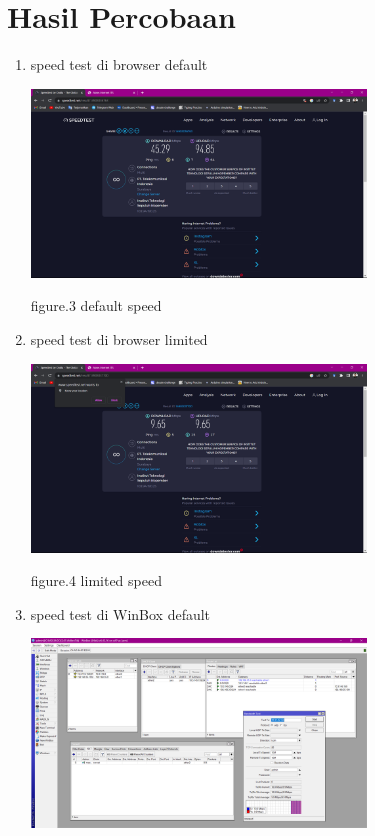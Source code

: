 \section{Hasil Percobaan}
\begin{enumerate}
    \item speed test di browser default
    \begin{center}
        \includegraphics[width=0.7\textwidth]{image/P3/browser/default.png}

        figure.3 default speed
    \end{center}
    \item speed test di browser limited
    \begin{center}
        \includegraphics[width=0.7\textwidth]{image/P3/browser/limited.png}

        figure.4 limited speed
    \end{center}
    \item speed test di WinBox default
    \begin{center}
        \includegraphics[width=0.7\textwidth]{image/P3/winbox/default.png}


\end{center}
\end{enumerate}
